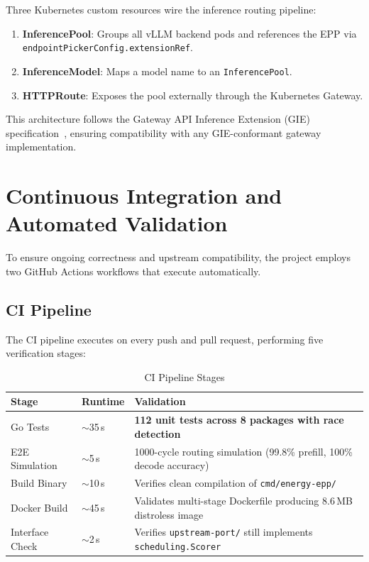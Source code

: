 Three Kubernetes custom resources wire the inference routing pipeline:

\begin{enumerate}
    \item \textbf{InferencePool}: Groups all vLLM backend pods and references the EPP via \texttt{endpointPickerConfig.extensionRef}.
    \item \textbf{InferenceModel}: Maps a model name to an \texttt{InferencePool}.
    \item \textbf{HTTPRoute}: Exposes the pool externally through the Kubernetes Gateway.
\end{enumerate}

This architecture follows the Gateway API Inference Extension (GIE) specification~\cite{gie-spec}, ensuring compatibility with any GIE-conformant gateway implementation.



\section{Continuous Integration and Automated Validation}
\label{sec:ci-cd}

To ensure ongoing correctness and upstream compatibility, the project employs two GitHub Actions workflows that execute automatically.

\subsection{CI Pipeline}
\label{subsec:ci-pipeline}

The CI pipeline executes on every push and pull request, performing five verification stages:

\begin{table}[htbp]
\centering
\caption{CI Pipeline Stages}
\label{tab:ci-stages}
\begin{tabular}{llp{6cm}}
\toprule
\textbf{Stage} & \textbf{Runtime} & \textbf{Validation} \\
\midrule
Go Tests & $\sim$35\,s & \textbf{112 unit tests across 8 packages with race detection} \\
E2E Simulation & $\sim$5\,s & 1000-cycle routing simulation (99.8\% prefill, 100\% decode accuracy) \\
Build Binary & $\sim$10\,s & Verifies clean compilation of \texttt{cmd/energy-epp/} \\
Docker Build & $\sim$45\,s & Validates multi-stage Dockerfile producing 8.6\,MB distroless image \\
Interface Check & $\sim$2\,s & Verifies \texttt{upstream-port/} still implements \texttt{scheduling.Scorer} \\
\bottomrule
\end{tabular}
\end{table}

